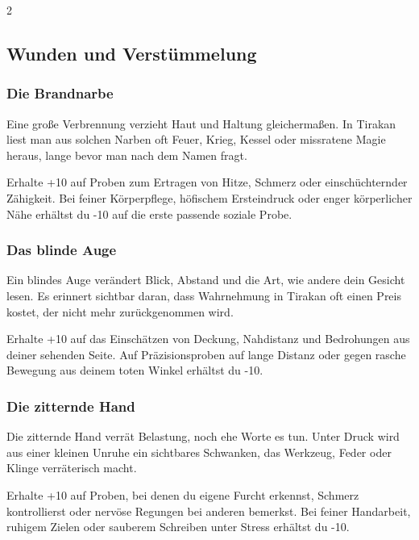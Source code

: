 {
    \begin{multicols*}{2}

        \subsection{Wunden und Verstümmelung}\label{subsec:male-wunden}

        \subsubsection*{Die Brandnarbe}
        Eine große Verbrennung verzieht Haut und Haltung gleichermaßen. In Tirakan liest man aus solchen Narben oft Feuer, Krieg, Kessel oder missratene Magie heraus, lange bevor man nach dem Namen fragt.

        \malspielwertebox
        {Erhalte +10 auf Proben zum Ertragen von Hitze, Schmerz oder einschüchternder Zähigkeit.}
        {Bei feiner Körperpflege, höfischem Ersteindruck oder enger körperlicher Nähe erhältst du -10 auf die erste passende soziale Probe.}

        \subsubsection*{Das blinde Auge}
        Ein blindes Auge verändert Blick, Abstand und die Art, wie andere dein Gesicht lesen. Es erinnert sichtbar daran, dass Wahrnehmung in Tirakan oft einen Preis kostet, der nicht mehr zurückgenommen wird.

        \malspielwertebox
        {Erhalte +10 auf das Einschätzen von Deckung, Nahdistanz und Bedrohungen aus deiner sehenden Seite.}
        {Auf Präzisionsproben auf lange Distanz oder gegen rasche Bewegung aus deinem toten Winkel erhältst du -10.}

        \subsubsection*{Die zitternde Hand}
        Die zitternde Hand verrät Belastung, noch ehe Worte es tun. Unter Druck wird aus einer kleinen Unruhe ein sichtbares Schwanken, das Werkzeug, Feder oder Klinge verräterisch macht.

        \malspielwertebox
        {Erhalte +10 auf Proben, bei denen du eigene Furcht erkennst, Schmerz kontrollierst oder nervöse Regungen bei anderen bemerkst.}
        {Bei feiner Handarbeit, ruhigem Zielen oder sauberem Schreiben unter Stress erhältst du -10.}


\end{multicols*}}
